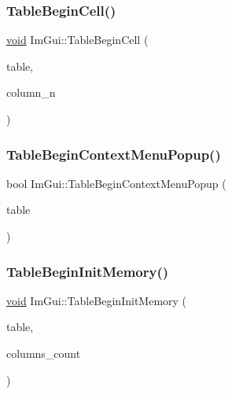 \subsubsection{\texorpdfstring{Table\+Begin\+Cell()}{TableBeginCell()}}
{\footnotesize\ttfamily \hyperlink{imgui__impl__opengl3__loader_8h_ac668e7cffd9e2e9cfee428b9b2f34fa7}{void} Im\+Gui\+::\+Table\+Begin\+Cell (\begin{DoxyParamCaption}\item[{\hyperlink{structImGuiTable}{Im\+Gui\+Table} $\ast$}]{table,  }\item[{int}]{column\+\_\+n }\end{DoxyParamCaption})}

\mbox{\label{namespaceImGui_ac5ffd2621218c244f701317f9086e6ff}} 
\subsubsection{\texorpdfstring{Table\+Begin\+Context\+Menu\+Popup()}{TableBeginContextMenuPopup()}}
{\footnotesize\ttfamily bool Im\+Gui\+::\+Table\+Begin\+Context\+Menu\+Popup (\begin{DoxyParamCaption}\item[{\hyperlink{structImGuiTable}{Im\+Gui\+Table} $\ast$}]{table }\end{DoxyParamCaption})}

\mbox{\label{namespaceImGui_a41533f5f77df0241f9f4aaa17d01a0d7}} 
\subsubsection{\texorpdfstring{Table\+Begin\+Init\+Memory()}{TableBeginInitMemory()}}
{\footnotesize\ttfamily \hyperlink{imgui__impl__opengl3__loader_8h_ac668e7cffd9e2e9cfee428b9b2f34fa7}{void} Im\+Gui\+::\+Table\+Begin\+Init\+Memory (\begin{DoxyParamCaption}\item[{\hyperlink{structImGuiTable}{Im\+Gui\+Table} $\ast$}]{table,  }\item[{int}]{columns\+\_\+count }\end{DoxyParamCaption})}


